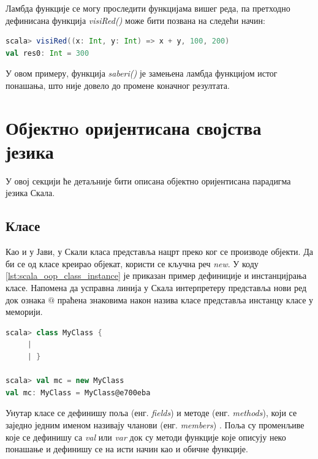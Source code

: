 \documentclass[12pt,oneside]{memoir}
\begin{document}
Ламбда функције се могу проследити функцијама вишег реда, па претходно дефинисана функција \textit{visiRed()} може бити позвана на следећи начин:

\begin{lstlisting}[language=Scala, caption={Прослеђивање ламбда функције другој функцији}, label={lst:scala_functions_lambda_high_order}]
scala> visiRed((x: Int, y: Int) => x + y, 100, 200)
val res0: Int = 300
\end{lstlisting}

\noindent У овом примеру, функција \textit{saberi()} је замењена ламбда функцијом истог понашања, што није довело до промене коначног резултата. 

\section{Објектнo оријентисана својства језика}
\label{sec:scala_oop}

У овој секцији ће детаљније бити описана објектно оријентисана парадигма језика Скала. 

\subsection{Класе}
\label{subsec:scala_klase}

Као и у Јави, у Скали класа представља нацрт преко ког се производе објекти. Да би се од класе креирао објекат, користи се кључна реч \textit{new}. У коду \ref{lst:scala_oop_class_instance} је приказан  пример дефиниције и инстанцијрања класе. Напомена да усправна линија у Скала интерпретеру представља нови ред док ознака $@$ праћена знаковима након назива класе представља инстанцу класе у меморији.

\begin{lstlisting}[language=Scala, caption={Дефиниција и инстанцирање класе у Скали}, label={lst:scala_oop_class_instance}]
scala> class MyClass {
     |     
     | }

scala> val mc = new MyClass
val mc: MyClass = MyClass@e700eba
\end{lstlisting}

Унутар класе се дефинишу поља (енг. \textit{fields}) и методе (енг. \textit{methods}), који се заједно једним именом називају чланови (енг. \textit{members}) \cite{scala_prog}. Поља су променљиве које се дефинишу са \textit{val} или \textit{var} док су методи функције које описују неко понашање и дефинишу се на исти начин као и обичне функције.
\end{document}
